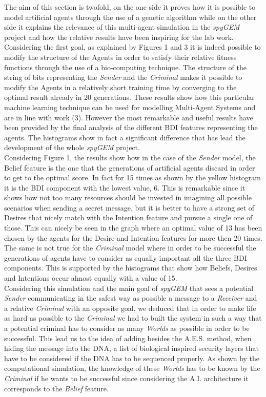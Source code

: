 \documentclass[a4paper]{article}
\begin{document}
The aim of this section is twofold, on the one side it proves how it is possible to model artificial agents through the use of a genetic algorithm while on the other side it explains the relevance of this multi-agent simulation in the \textit{spyGEM} project and how the relative results have been inspiring for the lab work. \\
Considering the first goal, as explained by Figures 1 and 3 it is indeed possible to modify the structure of the Agents in order to satisfy their relative fitness functions through the use of a bio-computing technique. The structure of the string of bits representing the \textit{Sender} and the \textit{Criminal} makes it possible to modify the Agents in a relatively short training time by converging to the optimal result already in 20 generations. These results show how this particular machine learning technique can be used for modelling Multi-Agent Systems and are in line with work (3). However the most remarkable and useful results have been provided by the final analysis of the different BDI features representing the agents. The histograms show in fact a significant difference that has lead the development of the whole \textit{spyGEM} project. \\         
Considering Figure 1, the results show how in the case of the \textit{Sender} model, the Belief feature is the one that the generations of artificial agents discard in order to get to the optimal score. In fact for 15 times as shown by the yellow histogram it is the BDI component with the lowest value, 6. This is remarkable since it shows how not too many resources should be invested in imagining all possible scenarios when sending a secret message, but it is better to have a strong set of Desires that nicely match with the Intention feature and pursue a single one of those. This can nicely be seen in the graph where an optimal value of 13 has been chosen by the agents for the Desire and Intention features for more then 20 times. The same is not true for the \textit{Criminal} model where in order to be successful the generations of agents have to consider as equally important all the three BDI components. This is supported by the histograms that show how Beliefs, Desires and Intentions occur almost equally with a value of 15. \\
Considering this simulation and the main goal of \textit{spyGEM} that sees a potential \textit{Sender} communicating in the safest way as possible a message to a \textit{Receiver} and a relative \textit{Criminal} with an opposite goal, we deduced that in order to make life as hard as possible to the \textit{Criminal} we had to built the system in such a way that a potential criminal has to consider as many \textit{Worlds} as possible in order to be successful. This lead us to the idea of adding besides the A.E.S. method, when hiding the message into the DNA, a list of biological inspired security layers that have to be considered if the DNA has to be sequenced properly. As shown by the computational simulation, the knowledge of these \textit{Worlds} has to be known by the \textit{Criminal} if he wants to be successful since considering the A.I. architecture it corresponds to the \textit{Belief} feature. \\
\end{document}

